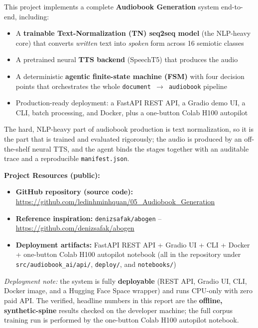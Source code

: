\documentclass[12pt,a4paper]{article}
\begin{document}
This project implements a complete \textbf{Audiobook Generation} system end-to-end, including:
\begin{itemize}
  \item A \textbf{trainable Text-Normalization (TN) seq2seq model} (the NLP-heavy core) that converts \emph{written} text into \emph{spoken} form across 16 semiotic classes
  \item A pretrained neural \textbf{TTS backend} (SpeechT5) that produces the audio
  \item A deterministic \textbf{agentic finite-state machine (FSM)} with four decision points that orchestrates the whole \texttt{document $\rightarrow$ audiobook} pipeline
  \item Production-ready deployment: a FastAPI REST API, a Gradio demo UI, a CLI, batch processing, and Docker, plus a one-button Colab H100 autopilot
\end{itemize}

The hard, NLP-heavy part of audiobook production is text normalization, so it is the part that is trained and evaluated rigorously; the audio is produced by an off-the-shelf neural TTS, and the agent binds the stages together with an auditable trace and a reproducible \texttt{manifest.json}.

\textbf{Project Resources (public):}
\begin{itemize}\setlength\itemsep{0.15em}
  \item \textbf{GitHub repository (source code):} \url{https://github.com/ledinhminhquan/05_Audiobook_Generation}
  \item \textbf{Reference inspiration:} \texttt{denizsafak/abogen} -- \url{https://github.com/denizsafak/abogen}
  \item \textbf{Deployment artifacts:} FastAPI REST API + Gradio UI + CLI + Docker + one-button Colab H100 autopilot notebook (all in the repository under \texttt{src/audiobook\_ai/api/}, \texttt{deploy/}, and \texttt{notebooks/})
\end{itemize}

\noindent\textit{Deployment note:} the system is fully \textbf{deployable} (REST API, Gradio UI, CLI, Docker image, and a Hugging Face Space wrapper) and runs CPU-only with zero paid API. The verified, headline numbers in this report are the \textbf{offline, synthetic-spine} results checked on the developer machine; the full corpus training run is performed by the one-button Colab H100 autopilot notebook.

\end{document}
